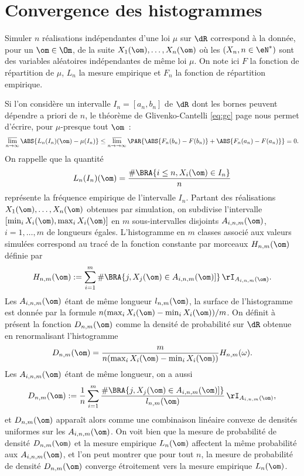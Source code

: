 %
\section{Convergence des histogrammes}
%

Simuler $n$ réalisations indépendantes d'une loi $\mu$ sur $\dR$ correspond à la
donnée, pour un $\om\in\Om$, de la suite $X_1(\om),\ldots,X_n(\om)$ où les $(X_n,
n\in\eN^*)$ sont des variables aléatoires indépendantes de même loi $\mu$. On note
ici $F$ la fonction de répartition de $\mu$, $L_n$ la mesure empirique et $F_n$
la fonction de répartition empirique.

Si l'on considère un intervalle $I_n=[a_n,b_n]$ de $\dR$ dont les bornes
peuvent dépendre a priori de $n$, le théorème de Glivenko-Cantelli
\eqref{eq:gc} page \pageref{th:gc} nous permet d'écrire, pour $\mu$-presque tout
$\om$~:
$$
\varlimsup_{n\to\infty} \ABS{L_n(I_n)(\om)-\mu(I_n)}
\leq\varlimsup_{n\to\to\infty}\PAR{\ABS{F_n(b_n)-F(b_n)}+\ABS{F_n(a_n)-F(a_n)}}= 0.
$$
On rappelle que la quantité
$$
L_n(I_n)(\om)=\frac{\#\BRA{i\leq n, X_i(\om)\in I_n}}{n}
$$
représente la fréquence empirique de l'intervalle $I_n$.  Partant des
réalisations $X_1(\om),\ldots,X_n(\om)$ obtenues par simulation, on subdivise
l'intervalle $[\min_i X_i(\om),\max_i X_i(\om)]$ en $m$ sous-intervalles
disjoints $A_{i,n,m}(\om)$, $i=1,\ldots,m$ de longueurs égales.  L'histogramme
en $m$ classes associé aux valeurs simulées correspond au tracé de la fonction
constante par morceaux $H_{n,m}(\om)$ définie par
$$
H_{n,m}(\om):=\sum_{i=1}^m \#\BRA{j, X_j(\om)\in A_{i,n,m}(\om)]}\,\rI_{A_{i,n,m}(\om)}.
$$
Les $A_{i,n,m}(\om)$ étant de même longueur $l_{n,m}(\om)$, la surface de
l'histogramme est donnée par la formule $n(\max_i X_i(\om)-\min_i
X_i(\om))/m$.  On définit à présent la fonction $D_{n,m}(\om)$ comme la
densité de probabilité sur $\dR$ obtenue en renormalisant l'histogramme
$$
D_{n,m}(\om)=\frac{m}{n(\max_i X_i(\om)-\min_i X_i(\om))} H_{n,m}(\omega).
$$
Les $A_{i,n,m}(\om)$ étant de même longueur, on a aussi
$$
D_{n,m}(\om):=
\frac{1}{n}\sum_{i=1}^m\frac{\#\BRA{j, X_j(\om)\in A_{i,n,m}(\om)]}}{l_{n,m}(\om)}\,\rI_{A_{i,n,m}(\om)},
$$
et $D_{n,m}(\om)$ apparaît alors comme une combinaison linéaire convexe de
densités uniformes sur les $A_{i,n,m}(\om)$. On voit bien que la mesure de
probabilité de densité $D_{n,m}(\om)$ et la mesure empirique $L_n(\om)$
affectent la même probabilité aux $A_{i,n,m}(\om)$, et l'on peut montrer que
pour tout $n$, la mesure de probabilité de densité $D_{n,m}(\om)$ converge
étroitement vers la mesure empirique $L_n(\om)$.

